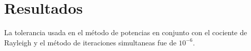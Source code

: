 \section{Resultados}

La tolerancia usada en el método de potencias en conjunto con el cociente de Rayleigh y el método de iteraciones simultaneas fue de $10^{-6}$.



